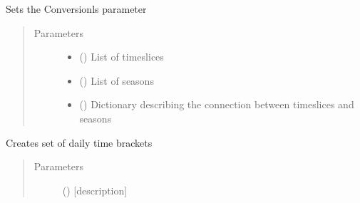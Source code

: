 \documentclass[a4paper,12pt,english]{article}
\begin{document}
\begin{fulllineitems}
\begin{fulllineitems}
\begin{quote}
\begin{description}
\begin{itemize}
\end{itemize}

\end{description}\end{quote}

\end{fulllineitems}


\begin{fulllineitems}
\label{\detokenize{GOCPI:GOCPI.CreateCases.CreateCases.set_conversion_ls}}
Sets the Conversionls parameter
\begin{quote}\begin{description}
\item[{Parameters}] \leavevmode\begin{itemize}
\item {} 
 () \textendash{} List of timeslices

\item {} 
 () \textendash{} List of seasons

\item {} 
 () \textendash{} Dictionary describing the connection between timeslices and seasons

\end{itemize}

\end{description}\end{quote}

\end{fulllineitems}


\begin{fulllineitems}
\label{\detokenize{GOCPI:GOCPI.CreateCases.CreateCases.set_daily_time_bracket}}
Creates set of daily time brackets
\begin{quote}\begin{description}
\item[{Parameters}] \leavevmode
{} () \textendash{} {[}description{]}


\end{description}
\end{quote}
\end{fulllineitems}
\end{fulllineitems}
\end{document}
